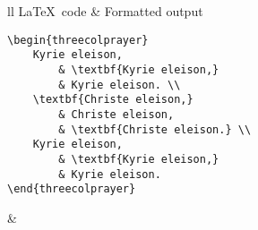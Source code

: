 \documentclass{article}
\begin{document}
\begin{table}[h!]
\centering
\begin{tabular}{ll}
\toprule
\LaTeX\ code & Formatted output \\
\midrule
\begin{lstlisting}
\begin{threecolprayer}
	Kyrie eleison, 
		& \textbf{Kyrie eleison,}
		& Kyrie eleison. \\
	\textbf{Christe eleison,}
		& Christe eleison,
		& \textbf{Christe eleison.} \\
	Kyrie eleison,
		& \textbf{Kyrie eleison,}
		& Kyrie eleison.
\end{threecolprayer}
\end{lstlisting}
&
\\
\bottomrule
\end{tabular}
\caption{The \lstinline{threecolprayer} environment.}
\label{tab:env_threecolprayer}
\end{table}
\end{document}
